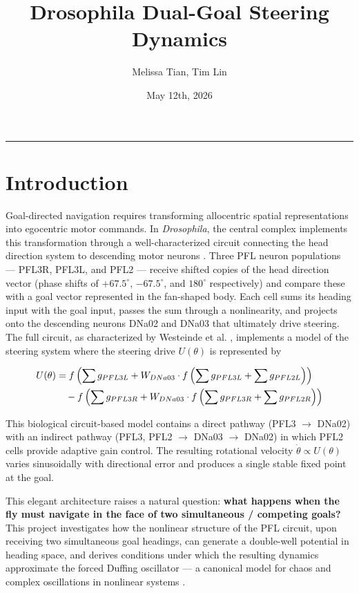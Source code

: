 \documentclass[11pt]{article}
\title{Drosophila Dual-Goal Steering Dynamics}
\author{Melissa Tian, Tim Lin}
\date{May 12th, 2026}
\begin{document}
\maketitle

\hrule
\vspace{1em}

\section{Introduction}

Goal-directed navigation requires transforming allocentric spatial representations into egocentric motor commands. In \textit{Drosophila}, the central complex implements this transformation through a well-characterized circuit connecting the head direction system to descending motor neurons \cite{westeinde2024}. Three PFL neuron populations --- PFL3R, PFL3L, and PFL2 --- receive shifted copies of the head direction vector (phase shifts of $+67.5^\circ$, $-67.5^\circ$, and $180^\circ$ respectively) and compare these with a goal vector represented in the fan-shaped body. Each cell sums its heading input with the goal input, passes the sum through a nonlinearity, and projects onto the descending neurons DNa02 and DNa03 that ultimately drive steering. The full circuit, as characterized by Westeinde et al. \cite{westeinde2024}, implements a model of the steering system where the steering drive $U(\theta)$ is represented by

\begin{align}
U(\theta) & =f\left( \sum g_{PFL3L}+W_{DNa03}\cdot f\left( \sum g_{PFL3L}+\sum g_{PFL2L} \right) \right) \notag \\
 & \quad -f\left( \sum g_{PFL3R}+W_{DNa03}\cdot f\left( \sum g_{PFL3R}+\sum g_{PFL2R} \right) \right)
\end{align}

This biological circuit-based model contains a direct pathway (PFL3 $\to$ DNa02) with an indirect pathway (PFL3, PFL2 $\to$ DNa03 $\to$ DNa02) in which PFL2 cells provide adaptive gain control. The resulting rotational velocity $\dot\theta \propto U(\theta)$ varies sinusoidally with directional error and produces a single stable fixed point at the goal.

This elegant architecture raises a natural question: \textbf{what happens when the fly must navigate in the face of two simultaneous / competing goals?} This project investigates how the nonlinear structure of the PFL circuit, upon receiving two simultaneous goal headings, can generate a double-well potential in heading space, and derives conditions under which the resulting dynamics approximate the forced Duffing oscillator --- a canonical model for chaos and complex oscillations in nonlinear systems \cite{guckenheimer1983}.
\end{document}

